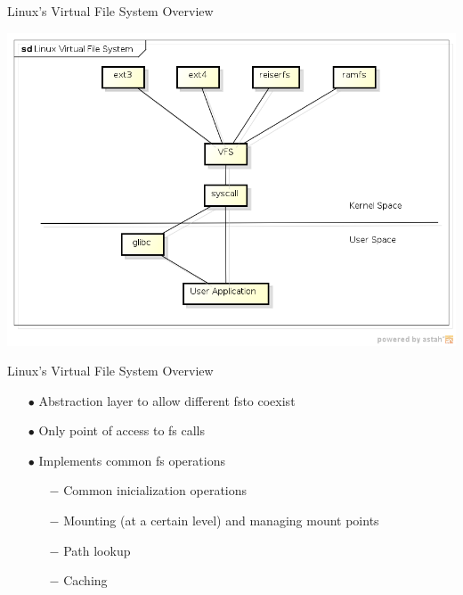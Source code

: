 \documentclass{beamer}
\begin{document}
\begin{frame}{Linux's Virtual File System Overview}

	\includegraphics[scale=0.5]{img/vfs_overview.png}

\end{frame}

\begin{frame}{Linux's Virtual File System Overview}

	\begin{itemize}
	
		\item[$\bullet$]{Abstraction layer to allow different fs\footnotemark[1] to coexist}	
		\item[$\bullet$]{Only point of access to fs calls}
		\item[$\bullet$]{Implements common fs operations}
			\begin{itemize}			
				\item[$-$]{Common inicialization operations}
				\item[$-$]{Mounting (at a certain level) and managing mount points}
				\item[$-$]{Path lookup}
				\item[$-$]{Caching}
			\end{itemize}	
	\end{itemize}


\end{frame}
\end{document}
